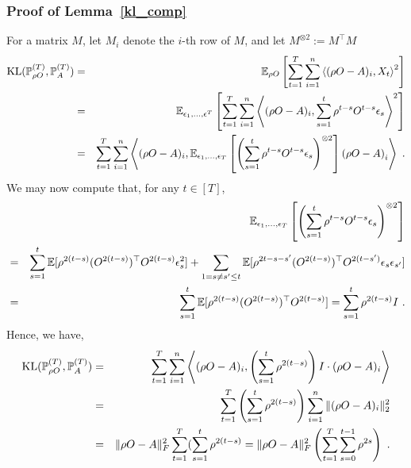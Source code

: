 \subsubsection{Proof of Lemma~\ref{kl_comp}\label{sec:kl_comp}}
For a matrix $M$, let $M_i$ denote the $i$-th row of $M$, and let $M^{\otimes 2} := M^\top M$
\begin{eqnarray*}
\mathrm{KL}(\mathbb{P}_{\rho O}^{(T)},\mathbb{P}_{A}^{(T)})
&=& \mathbb{E}_{\rho O}\left[\sum_{t=1}^T\sum_{i=1}^n\left\langle (\rho O-A)_i, X_t \right\rangle^2 \right]\\
&=& \mathbb{E}_{\epsilon_1,\dots,\epsilon^T}\left[\sum_{t=1}^T\sum_{i=1}^n\left\langle (\rho O-A)_i , \sum_{s=1}^t \rho^{t - s}O^{t-s}\epsilon_s \right\rangle^2 \right]\\
&=& \sum_{t=1}^T\sum_{i=1}^n\left\langle (\rho O - A)_i, \mathbb{E}_{\epsilon_1,\dots,\epsilon_T}\left[ \left(\sum_{s=1}^t \rho^{t - s}O^{t-s}\epsilon_s\right)^{\otimes 2}\right]\left(\rho O-A\right)_i \right\rangle~.\\
\end{eqnarray*}
We may now compute that, for any $t \in [T]$,
\begin{eqnarray*}
&&\mathbb{E}_{\epsilon_1,\dots,\epsilon_T}\left[ \left(\sum_{s=1}^t \rho^{t - s}O^{t-s}\epsilon_s\right)^{\otimes 2}\right] \\
&=& \sum_{s = 1}^t \mathbb{E}[ \rho^{2(t-s)} (O^{2(t-s)})^{\top} O^{2(t-s)} \epsilon_s^2] + \sum_{1 = s \ne s' \le t} \mathbb{E}[ \rho^{2t-s - s'} (O^{2(t-s)})^{\top} O^{2(t-s')} \epsilon_s \epsilon_{s'}]\\
 &=& \sum_{s = 1}^t \mathbb{E}[ \rho^{2(t-s)} (O^{2(t-s)})^{\top} O^{2(t-s)}] = \sum_{s = 1}^t \rho^{2(t-s)}  I~.
\end{eqnarray*}
Hence, we have,
\begin{eqnarray*}
\mathrm{KL}(\mathbb{P}_{\rho O}^{(T)},\mathbb{P}_{A}^{(T)})  &=& \sum_{t=1}^T\sum_{i=1}^n\left\langle (\rho O-A)_i, \left(\sum_{s=1}^t \rho^{2(t - s)}\right) I  \cdot (\rho O-A )_i \right\rangle\\
&=& \sum_{t=1}^T\left(\sum_{s=1}^t \rho^{2(t - s)}\right) \sum_{i=1}^n \|(\rho O-A)_i\|^2_2  \\
&=& \|\rho O-A\|_F^2 \sum_{t=1}^T (\sum_{s=1}^t \rho^{2(t - s)} = \|\rho O-A\|_F^2\left( \sum_{t=1}^T \sum_{s=0}^{t-1} \rho^{2s}\right) ~.
\end{eqnarray*}


